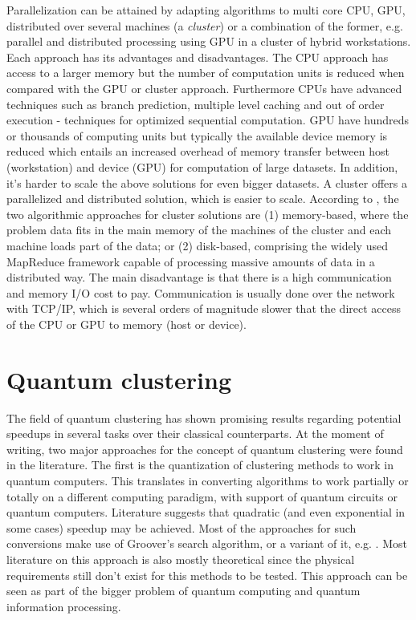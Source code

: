Parallelization can be attained by adapting algorithms to multi core CPU, GPU, distributed over several machines (a \emph{cluster}) or a combination of the former, e.g. parallel and distributed processing using GPU in a cluster of hybrid workstations.
Each approach has its advantages and disadvantages.
The CPU approach has access to a larger memory but the number of computation units is reduced when compared with the GPU or cluster approach.
Furthermore CPUs have advanced techniques such as branch prediction, multiple level caching and out of order execution - techniques for optimized sequential computation.
GPU have hundreds or thousands of computing units but typically the available device memory is reduced which entails an increased overhead of memory transfer between host (workstation) and device (GPU) for computation of large datasets.
In addition, it's harder to scale the above solutions for even bigger datasets.
A cluster offers a parallelized and distributed solution, which is easier to scale.
According to \cite{Aggarwal2014}, the two algorithmic approaches for cluster solutions are (1) memory-based, where the problem data fits in the main memory of the machines of the cluster and each machine loads part of the data; or (2) disk-based, comprising the widely used MapReduce framework capable of processing massive amounts of data in a distributed way.
The main disadvantage is that there is a high communication and memory I/O cost to pay.
Communication is usually done over the network with TCP/IP, which is several orders of magnitude slower that the direct access of the CPU or GPU to memory (host or device).

\section{Quantum clustering}
\label{sec:quantum clustering}

The field of quantum clustering has shown promising results regarding potential speedups in several tasks over their classical counterparts. 
At the moment of writing, two major approaches for the concept of quantum clustering were found in the literature.
The first is the quantization of clustering methods to work in quantum computers.
This translates in converting algorithms to work partially or totally on a different computing paradigm, with support of quantum circuits or quantum computers.
Literature suggests that quadratic (and even exponential in some cases) speedup may be achieved.
Most of the approaches for such conversions make use of Groover's search algorithm, or a variant of it, e.g. \cite{Wiebe2014}.
Most literature on this approach is also mostly theoretical since the physical requirements still don't exist for this methods to be tested.
This approach can be seen as part of the bigger problem of quantum computing and quantum information processing.

